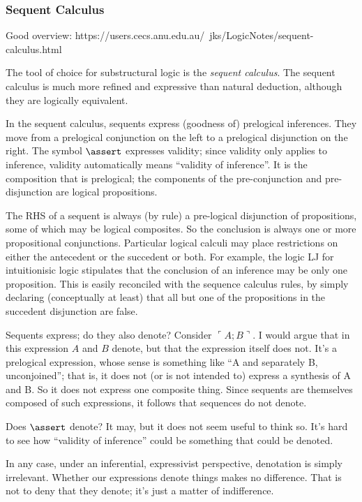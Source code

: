 \documentclass{article}
\begin{document}
\subsubsection{Sequent Calculus}

Good overview:
https://users.cecs.anu.edu.au/~jks/LogicNotes/sequent-calculus.html


The tool of choice for substructural logic is the \textit{sequent
  calculus}. The sequent calculus is much more refined and expressive
than natural deduction, although they are logically equivalent.

In the sequent calculus, sequents express (goodness of) prelogical
inferences. They move from a prelogical conjunction on the left to a
prelogical disjunction on the right. The symbol \(\linfer\) expresses
validity; since validity only applies to inference, validity
automatically means ``validity of inference''. It is the composition
that is prelogical; the components of the pre-conjunction and
pre-disjunction are logical propositions.

The RHS of a sequent is always (by rule) a pre-logical disjunction of
propositions, some of which may be logical composites. So the
conclusion is always one or more propositional conjunctions.
Particular logical calculi may place restrictions on either the
antecedent or the succedent or both. For example, the logic LJ for
intuitionisic logic stipulates that the conclusion of an inference may
be only one proposition. This is easily reconciled with the sequence
calculus rules, by simply declaring (conceptually at least) that all
but one of the propositions in the succedent disjunction are false.

Sequents express; do they also denote? Consider \(\ulcorner
A;B\urcorner\). I would argue that in this expression \(A\) and \(B\)
denote, but that the expression itself does not. It's a prelogical
expression, whose sense is something like ``A and separately B,
unconjoined''; that is, it does not (or is not intended to) express a
synthesis of A and B. So it does not express one composite thing.
Since sequents are themselves composed of such expressions, it follows
that sequences do not denote.

Does \(\linfer\) denote? It may, but it does not seem useful to think
so. It's hard to see how ``validity of inference'' could be something
that could be denoted.

In any case, under an inferential, expressivist perspective,
denotation is simply irrelevant. Whether our expressions denote things
makes no difference. That is not to deny that they denote; it's just a
matter of indifference.
\end{document}
